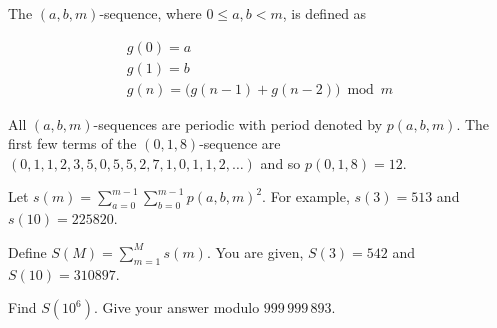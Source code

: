 The $(a,b,m)$-sequence, where $0 \leq a,b \lt m$, is defined as

$$\begin{align*}
g(0)=a\\
g(1)=b\\
g(n)= \big(g(n-1) + g(n-2)\big) \bmod m
\end{align*}
$$

All $(a,b,m)$-sequences are periodic with period denoted by $p(a,b,m)$.
The first few terms of the $(0,1,8)$-sequence are $(0,1,1,2,3,5,0,5,5,2,7,1,0,1,1,2,\ldots )$ and so $p(0,1,8)=12$.

Let $\displaystyle s(m)=\sum_{a=0}^{m-1}\sum_{b=0}^{m-1} p(a,b,m)^2$. For example, $s(3)=513$ and $s(10)=225820$.

Define $\displaystyle S(M)=\sum_{m=1}^{M}s(m)$. You are given, $S(3)=542$ and $S(10)=310897$.

Find $S(10^6)$. Give your answer modulo $999\,999\,893$.


